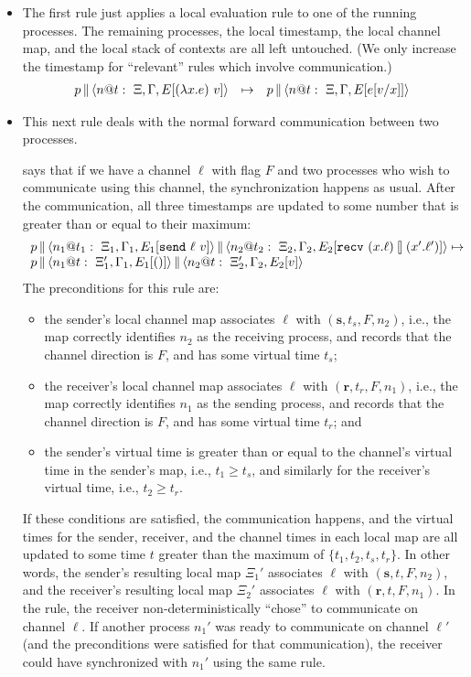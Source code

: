 \documentclass{article}
\begin{document}
\begin{itemize}
\item The first rule just applies a local evaluation rule to one of the
  running processes. The remaining processes, the local timestamp, the local
  channel map, and the local stack of contexts are all left untouched. (We
  only increase the timestamp for ``relevant'' rules which involve
  communication.)
\[\begin{array}{rcl}
  \parc{p}{\proc{n}{\Gamma}{\Xi}{E[(\lambda x.e)~v]}{t}} &\mapsto& 
  \parc{p}{\proc{n}{\Gamma}{\Xi}{E[e[v/x]]}{t}}
\end{array}\]

\item This next rule deals with the normal forward communication between two
  processes. 

says that if we have a channel $\ell$ with flag $F$ and two
  processes who wish to communicate using this channel, the synchronization
  happens as usual. After the communication, all three timestamps are updated
  to some number that is greater than or equal to their maximum:
\[\begin{array}{l}
  \parc{p}
  {\parc{\proc{n_1}{\Gamma_1}{\Xi_1}{E_1[\send{\ell}{v}]}{t_1}}
        {\proc{n_2}{\Gamma_2}{\Xi_2}{E_2[\recv{x}{\ell}{x'}{\ell'}]}{t_2}}}
  \mapsto \\
  \parc{p}{\parc{\proc{n_1}{\Gamma_1}{\Xi_1'}{E_1[()]}{t}}
    {\proc{n_2}{\Gamma_2}{\Xi_2'}{E_2[v]}{t}}}
\end{array}\]
The preconditions for this rule are: 
\begin{itemize}
\item the sender's local channel map associates $\ell$ with
  $(\textbf{s},t_s,F,n_2)$, i.e., the map correctly identifies $n_2$ as the
  receiving process, and records that the channel direction is $F$, and has
  some virtual time $t_s$;
\item the receiver's local channel map associates $\ell$ with
  $(\textbf{r},t_r,F,n_1)$, i.e., the map correctly identifies $n_1$ as the
  sending process, and records that the channel direction is $F$, and has
  some virtual time $t_r$; and
\item the sender's virtual time is greater than or equal to the channel's
  virtual time in the sender's map, i.e., $t_1 \geq t_s$, and similarly for
  the receiver's virtual time, i.e., $t_2 \geq t_r$.
\end{itemize}
If these conditions are satisfied, the communication happens, and the virtual
times for the sender, receiver, and the channel times in each local map are
all updated to some time $t$ greater than the maximum of
$\{t_1,t_2,t_s,t_r\}$. In other words, the sender's resulting local map
$\Xi_1'$ associates $\ell$ with $(\textbf{s},t,F,n_2)$, and the receiver's
resulting local map $\Xi_2'$ associates $\ell$ with
$(\textbf{r},t,F,n_1)$. In the rule, the receiver non-deterministically
``chose'' to communicate on channel $\ell$. If another process $n_1'$ was
ready to communicate on channel $\ell'$ (and the preconditions were satisfied
for that communication), the receiver could have synchronized with $n_1'$
using the same rule.


\end{itemize}
\end{document}

